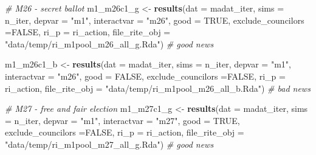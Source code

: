 \documentclass[]{article}
\newenvironment{Shaded}{\begin{snugshade}}{\end{snugshade}}
\newcommand{\KeywordTok}[1]{\textcolor[rgb]{0.13,0.29,0.53}{\textbf{#1}}}
\newcommand{\DataTypeTok}[1]{\textcolor[rgb]{0.13,0.29,0.53}{#1}}
\newcommand{\StringTok}[1]{\textcolor[rgb]{0.31,0.60,0.02}{#1}}
\newcommand{\CommentTok}[1]{\textcolor[rgb]{0.56,0.35,0.01}{\textit{#1}}}
\newcommand{\OtherTok}[1]{\textcolor[rgb]{0.56,0.35,0.01}{#1}}
\newcommand{\NormalTok}[1]{#1}
\begin{document}
\begin{Shaded}
\begin{Highlighting}[]
\CommentTok{# M26 - secret ballot}
\NormalTok{m1_m26c1_g <-}\StringTok{ }\KeywordTok{results}\NormalTok{(}\DataTypeTok{dat =}\NormalTok{ madat_iter, }\DataTypeTok{sims =}\NormalTok{ n_iter, }
                      \DataTypeTok{depvar =} \StringTok{"m1"}\NormalTok{, }\DataTypeTok{interactvar =} \StringTok{"m26"}\NormalTok{, }\DataTypeTok{good =} \OtherTok{TRUE}\NormalTok{, }\DataTypeTok{exclude_councilors =}\OtherTok{FALSE}\NormalTok{,}
                      \DataTypeTok{ri_p =}\NormalTok{ ri_action, }\DataTypeTok{file_rite_obj =} \StringTok{"data/temp/ri_m1pool_m26_all_g.Rda"}\NormalTok{)  }\CommentTok{# good news}
\end{Highlighting}
\end{Shaded}

\begin{Shaded}
\begin{Highlighting}[]
\NormalTok{m1_m26c1_b <-}\StringTok{ }\KeywordTok{results}\NormalTok{(}\DataTypeTok{dat =}\NormalTok{ madat_iter, }\DataTypeTok{sims =}\NormalTok{ n_iter, }
                      \DataTypeTok{depvar =} \StringTok{"m1"}\NormalTok{, }\DataTypeTok{interactvar =} \StringTok{"m26"}\NormalTok{, }\DataTypeTok{good =} \OtherTok{FALSE}\NormalTok{, }\DataTypeTok{exclude_councilors =}\OtherTok{FALSE}\NormalTok{,}
                      \DataTypeTok{ri_p =}\NormalTok{ ri_action, }\DataTypeTok{file_rite_obj =} \StringTok{"data/temp/ri_m1pool_m26_all_b.Rda"}\NormalTok{) }\CommentTok{# bad news}
\end{Highlighting}
\end{Shaded}

\begin{Shaded}
\begin{Highlighting}[]
\CommentTok{# M27 - free and fair election}
\NormalTok{m1_m27c1_g <-}\StringTok{ }\KeywordTok{results}\NormalTok{(}\DataTypeTok{dat =}\NormalTok{ madat_iter, }\DataTypeTok{sims =}\NormalTok{ n_iter, }
                      \DataTypeTok{depvar =} \StringTok{"m1"}\NormalTok{, }\DataTypeTok{interactvar =} \StringTok{"m27"}\NormalTok{, }\DataTypeTok{good =} \OtherTok{TRUE}\NormalTok{, }\DataTypeTok{exclude_councilors =}\OtherTok{FALSE}\NormalTok{,}
                      \DataTypeTok{ri_p =}\NormalTok{ ri_action, }\DataTypeTok{file_rite_obj =} \StringTok{"data/temp/ri_m1pool_m27_all_g.Rda"}\NormalTok{)  }\CommentTok{# good news}
\end{Highlighting}
\end{Shaded}
\end{document}
